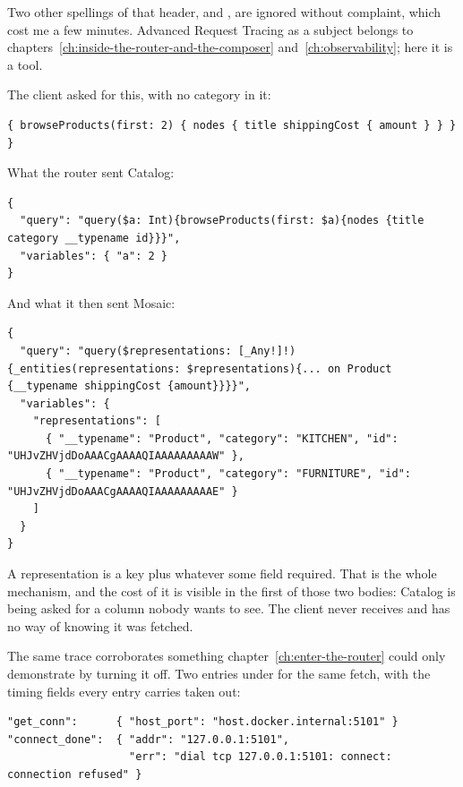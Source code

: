 Two other spellings of that header,  and
, are ignored without complaint, which cost me a few
minutes. Advanced Request Tracing as a subject belongs to
chapters~\ref{ch:inside-the-router-and-the-composer}
and~\ref{ch:observability}; here it is a tool.

The client asked for this, with no category in it:

\begin{verbatim}
{ browseProducts(first: 2) { nodes { title shippingCost { amount } } } }
\end{verbatim}

What the router sent Catalog:

\begin{verbatim}
{
  "query": "query($a: Int){browseProducts(first: $a){nodes {title category __typename id}}}",
  "variables": { "a": 2 }
}
\end{verbatim}

And what it then sent Mosaic:

\begin{verbatim}
{
  "query": "query($representations: [_Any!]!){_entities(representations: $representations){... on Product {__typename shippingCost {amount}}}}",
  "variables": {
    "representations": [
      { "__typename": "Product", "category": "KITCHEN", "id": "UHJvZHVjdDoAAACgAAAAQIAAAAAAAAAW" },
      { "__typename": "Product", "category": "FURNITURE", "id": "UHJvZHVjdDoAAACgAAAAQIAAAAAAAAAE" }
    ]
  }
}
\end{verbatim}

%
A representation is a key plus whatever some field required. That is the whole
mechanism, and the cost of it is visible in the first of those two bodies:
Catalog is being asked for a column nobody wants to see. The client never
receives  and has no way of knowing it was fetched.

%
The same trace corroborates something chapter~\ref{ch:enter-the-router} could
only demonstrate by turning it off. Two entries under  for the
same fetch, with the timing fields every entry carries taken out:

\begin{verbatim}
"get_conn":      { "host_port": "host.docker.internal:5101" }
"connect_done":  { "addr": "127.0.0.1:5101",
                   "err": "dial tcp 127.0.0.1:5101: connect: connection refused" }
\end{verbatim}

